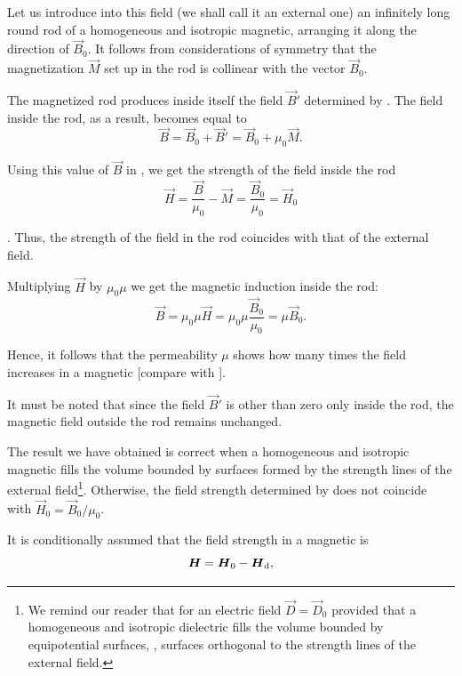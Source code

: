 \noindent
Let us introduce into this field (we shall call it an external one) an infinitely long round rod of a homogeneous and isotropic magnetic, arranging it along the direction of $\vec{B}_0$.
It follows from considerations of symmetry that the magnetization $\vec{M}$ set up in the rod is collinear with the vector $\vec{B}_0$.

The magnetized rod produces inside itself the field $\vec{B}'$ determined by .
The field inside the rod, as a result, becomes equal to
\begin{equation}\label{eq:7_25}
    \vec{B} = \vec{B}_0 + \vec{B}' = \vec{B}_0 + \mu_0 \vec{M}.
\end{equation}

\noindent
Using this value of $\vec{B}$ in , we get the strength of the field inside the rod
\begin{equation*}
    \vec{H} = \frac{\vec{B}}{\mu_0} - \vec{M} = \frac{\vec{B}_0}{\mu_0} = \vec{H}_0
\end{equation*}

. Thus, the strength of the field in the rod coincides with that of the external field.

Multiplying $\vec{H}$ by $\mu_0\mu$ we get the magnetic induction inside the rod:
\begin{equation}\label{eq:7_26}
    \vec{B} = \mu_0\mu\vec{H} = \mu_0\mu \frac{\vec{B}_0}{\mu_0} = \mu \vec{B}_0.
\end{equation}

\noindent
Hence, it follows that the permeability $\mu$ shows how many times the field increases in a magnetic [compare with ].

It must be noted that since the field $\vec{B}'$ is other than zero only inside the rod, the magnetic field outside the rod remains unchanged.

The result we have obtained is correct when a homogeneous and isotropic magnetic fills the volume bounded by surfaces formed by the strength lines of the external field\footnote{We remind our reader that for an electric field $\vec{D} = \vec{D}_0$ provided that a homogeneous and isotropic dielectric fills the volume bounded by equipotential surfaces, \ie, surfaces orthogonal to the strength lines of the external field.}.
Otherwise, the field strength determined by  does not coincide with $\vec{H}_0=\vec{B}_0/\mu_0$.

It is conditionally assumed that the field strength in a magnetic is
\begin{equation}\label{eq:7_27}
    \boldsymbol{H} = \boldsymbol{H}_0 - \boldsymbol{H}_{\text{d}},
\end{equation}

